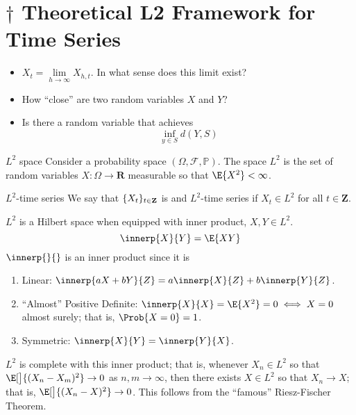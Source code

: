 \section{\texorpdfstring{$ \dagger $}{†} Theoretical L2 Framework for Time Series}
\begin{itemize}
    \item $ X_t = \lim\limits_{{h} \to {\infty}} X_{h,t} $. In what sense
          does this limit exist?
    \item How ``close'' are two random variables $ X $ and $ Y $?
    \item Is there a random variable that achieves
          \[ \inf_{y\in S}d(Y,S) \]
\end{itemize}
\begin{Definition}{$ L^2 $ space}{}
    Consider a probability space $ (\Omega,\mathcal{F},\mathbb{P}) $.
    The space $ L^2 $ is the set of random variables
    $ X:\Omega\to\mathbf{R} $ measurable so that $ \E{X^2}<\infty $.
\end{Definition}
\begin{Definition}{$ L^2 $-time series}{}
    We say that $ \{X_t\}_{t\in\mathbf{Z}} $ is
    and $ L^2 $-time series if $ X_t\in L^2 $ for all
    $ t\in\mathbf{Z} $.
\end{Definition}
$ L^2 $ is a Hilbert space when equipped
with inner product, $ X,Y\in L^2 $.
\[ \innerp{X}{Y}=\E{XY} \]
$ \innerp{}{} $ is an inner product since it is
\begin{enumerate}[(1)]
    \item Linear: $ \innerp{aX+bY}{Z}=a\innerp{X}{Z}+b\innerp{Y}{Z} $.
    \item ``Almost'' Positive Definite:
          $ \innerp{X}{X}=\E{X^2}=0 \iff X=0 $ almost surely; that is, $ \Prob{X=0}=1 $.
    \item Symmetric: $ \innerp{X}{Y}=\innerp{Y}{X} $.
\end{enumerate}
$ L^2 $ is complete with this inner product; that is,
whenever $ X_n\in L^2 $ so that $ \E[\big]{(X_n-X_m)^2}\to 0 $
as $ n,m\to\infty $, then there exists $ X\in L^2 $
so that $ X_n\to X $; that is, $ \E[\big]{(X_n-X)^2}\to 0 $.
This follows from the ``famous'' Riesz-Fischer Theorem.
